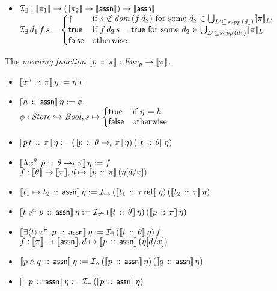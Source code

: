 \documentclass[12pt,a4paper]{report}
\newcommand{\I}{\mathcal{I}}
\begin{document}
\begin{itemize}
  \item $\I_\exists: \semantic{\pi_1} \to (\semantic{\pi_2} \to \semantic{\tassn}) \to \semantic{\tassn}$ \\[1ex]
        $\I_\exists\,d_1\,f\,s =
          \bcase
            \uparrow  & \text{if } s \not\in \dom{f\,d_2}
                        \text{ for some }d_2 \in \bigcup_{L'\subseteq\supp{d_1}}\semantic{\pi}_{L'} \\
            \true     & \text{if } f\,d_2\,s = \true
                        \text{ for some } d_2 \in \bigcup_{L'\subseteq\supp{d_1}}\semantic{\pi}_{L'} \\
            \false    & \text{otherwise}
          \ecase$
\end{itemize}

\noindent The {\em meaning function} $\llbracket p\,\mathrel{::}\,\pi\rrbracket: \mathit{Env}_p \to \llbracket\pi\rrbracket$.
\begin{itemize}
  \item $\llbracket x^\pi\,\mathrel{::}\,\pi\rrbracket\,\eta := \eta\,x$

  \item $\llbracket h\,\mathrel{::}\,\mathsf{assn}\rrbracket\,\eta := \phi$ \\[1ex]
        $\phi:\mathit{Store} \hookrightarrow \mathit{Bool},
          s \mapsto \left\{\!\!\!\begin{array}{ll}
                      \mathsf{true}   & \text{if } \eta \models h \\
                      \mathsf{false}  & \text{otherwise}
                    \end{array}\right.$

  \item $\llbracket p\,t\,\mathrel{::}\,\pi\rrbracket\,\eta :=
          (\llbracket p\,\mathrel{::}\,\theta\rightarrow_t\pi\rrbracket\,\eta)\,
          (\llbracket t\,\mathrel{::}\,\theta\rrbracket\,\eta)$

  \item $\llbracket\Lambda x^\theta.\,p\,\mathrel{::}\,\theta\rightarrow_t\pi\rrbracket\,\eta := f$ \\[1ex]
        $f: \llbracket\theta\rrbracket \to \llbracket\pi\rrbracket,
          d \mapsto \llbracket p\,\mathrel{::}\,\pi\rrbracket\,(\eta[d/x])$

  \item $\semantic{\tj{t_1 \mapsto t_2}{\tassn}}\,\eta :=
          \I_{\mapsto}\,(\semantic{\tj{t_1}{\tref{\tau}}}\,\eta)\,(\semantic{\tj{t_2}{\tau}}\,\eta)$

  \item $\semantic{\tj{t \not\rightleftharpoons p}{\tassn}}\,\eta :=
          \I_{\not\rightleftharpoons}\,(\semantic{\tj{t}{\theta}}\,\eta)\,(\semantic{\tj{p}{\pi}}\,\eta)$

  \item $\semantic{\tj{\qbex{x^\pi}{t}{p}}{\tassn}}\,\eta :=
          \I_\exists\,(\semantic{\tj{t}{\theta}}\,\eta)\,f$ \\[1ex]
        $f: \llbracket\pi\rrbracket \to \llbracket\mathsf{assn}\rrbracket, d \mapsto \llbracket p\,\mathrel{::}\,\mathsf{assn}\rrbracket\,(\eta[d/x])$

  \item $\semantic{\tj{p \wedge q}{\tassn}}\,\eta :=
          \I_\wedge\,(\semantic{\tj{p}{\tassn}}\,\eta)\,(\semantic{\tj{q}{\tassn}}\,\eta)$

  \item $\semantic{\tj{\neg p}{\tassn}}\,\eta :=
          \I_\neg\,(\semantic{\tj{p}{\tassn}}\,\eta)$
\end{itemize}
\end{document}
